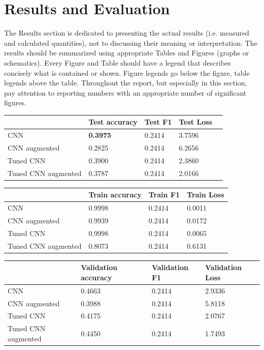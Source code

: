 \section{Results and Evaluation}
The Results section is dedicated to presenting the actual results (i.e. measured and calculated quantities), not to discussing their meaning or interpretation.
The results should be summarized using appropriate Tables and Figures (graphs or schematics).
Every Figure and Table should have a legend that describes concisely what is contained or shown.
Figure legends go below the figure, table legends above the table.
Throughout the report, but especially in this section, pay attention to reporting numbers with an appropriate number of significant figures.


\begin{table}[ht]
\begin{tabular}{|l|l|l|l|l|}
\hline
                    & Test accuracy   & Test F1 & Test Loss \\ \hline
CNN                 & \textbf{0.3975} & 0.2414  & 3.7596    \\ \hline
CNN augmented       & 0.2825          & 0.2414  & 6.2656    \\ \hline
Tuned CNN           & 0.3900          & 0.2414  & 2.3860    \\ \hline
Tuned CNN augmented & 0.3787          & 0.2414  & 2.0166    \\ \hline
\end{tabular}
\end{table}

\begin{table}[ht]
\begin{tabular}{|l|l|l|l|}
\hline
                    & Train accuracy & Train F1 & Train Loss \\ \hline
CNN                 & 0.9998         & 0.2414   & 0.0011     \\ \hline
CNN augmented       & 0.9939         & 0.2414   & 0.0172     \\ \hline
Tuned CNN           & 0.9998         & 0.2414   & 0.0065     \\ \hline
Tuned CNN augmented & 0.8073         & 0.2414   & 0.6131     \\ \hline
\end{tabular}
\end{table}

\begin{table}[ht]
\begin{tabular}{|l|l|l|l|}
\hline
                    & Validation accuracy & Validation F1 & Validation Loss \\ \hline
CNN                 & 0.4663              & 0.2414        & 2.9336          \\ \hline
CNN augmented       & 0.3988              & 0.2414        & 5.8118          \\ \hline
Tuned CNN           & 0.4175              & 0.2414        & 2.0767          \\ \hline
Tuned CNN augmented & 0.4450              & 0.2414        & 1.7493          \\ \hline
\end{tabular}
\end{table}

